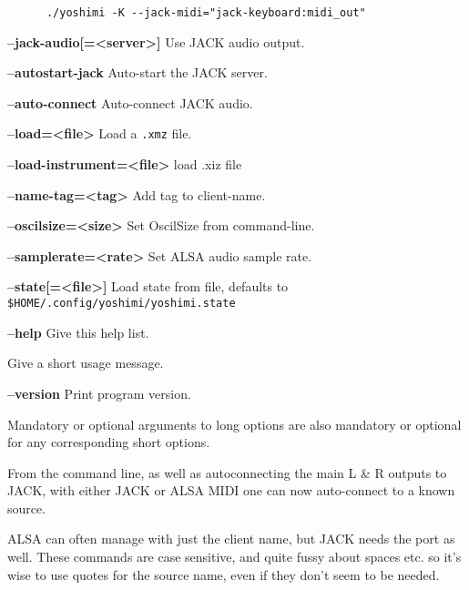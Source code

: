   \begin{verbatim}
      ./yoshimi -K --jack-midi="jack-keyboard:midi_out"
   \end{verbatim}

      \textbf{--jack-audio[=<server>]}
      Use JACK audio output.

      \textbf{--autostart-jack}
      Auto-start the JACK server.

      \textbf{--auto-connect}
      Auto-connect JACK audio.

      \textbf{--load=<file>}
      Load a \texttt{.xmz} file.

      \textbf{--load-instrument=<file>}
      load .xiz file

      \textbf{--name-tag=<tag>}
      Add tag to client-name.

      \textbf{--oscilsize=<size>}
      Set OscilSize from command-line.

      \textbf{--samplerate=<rate>}
      Set ALSA audio sample rate.

      \textbf{--state[=<file>]}
      Load state from file, defaults to
      \texttt{\$HOME/.config/yoshimi/yoshimi.state}

      \textbf{--help}
      Give this help list.

      Give a short usage message.

      \textbf{--version}
      Print program version.

   Mandatory or optional arguments to long options are also mandatory or optional
   for any corresponding short options.

   From the command line, as well as autoconnecting the main L \& R outputs
   to JACK, with either JACK or ALSA MIDI one can now auto-connect to a
   known source.

   ALSA can often manage with just the client name, but JACK needs the port
   as well. These commands are case sensitive, and quite fussy about spaces
   etc. so it's wise to use quotes for the source name, even if they don't
   seem to be needed.

